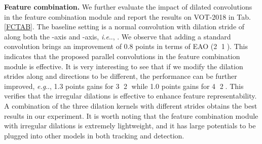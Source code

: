 \documentclass[runningheads]{llncs}
\makeatletter
\DeclareRobustCommand\onedot{\futurelet\@let@token\@onedot}
\def\@onedot{\ifx\@let@token.\else.\null\fi\xspace}
\def\eg{\emph{e.g}\onedot} \def\Eg{\emph{E.g}\onedot}
\def\ie{\emph{i.e}\onedot} \def\Ie{\emph{I.e}\onedot}
\makeatother
\begin{document}
\noindent\textbf{Feature combination.} We further evaluate the impact of dilated convolutions in the feature combination module and report the results on VOT-2018 in Tab. \ref{FCTAB}. The baseline setting is a normal convolution with dilation stride of  along both the -axis and -axis, \ie, . We observe that adding a standard convolution  brings an improvement of 0.8 points in terms of EAO (\textcircled{2} \vs \textcircled{1}). This indicates that the proposed parallel convolutions in the feature combination module is effective. It is very interesting to see that if we modify the dilation strides along  and  directions to be different, the performance can be further improved, \eg, 1.3 points gains for \textcircled{3} \vs \textcircled{2} while 1.0 points gains for \textcircled{4} \vs \textcircled{2}. This verifies that the irregular dilations is effective to enhance feature representability. A combination of the three dilation kernels with different strides obtains the best results in our experiment. It is worth noting that the feature combination module with irregular dilations is extremely lightweight, and it has large potentials to be plugged into other models in both tracking and detection.
\end{document}
